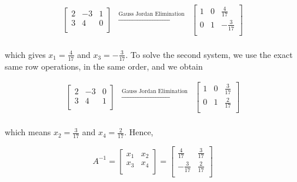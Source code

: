 \documentclass{ximera}
\begin{document}
\[ \begin{array}{ccc}

\left[ \begin{array}{rr|r} 2 & -3 & 1 \\ 3 & 4 & 0 \\ \end{array} \right] 
&
\xrightarrow{\text{Gauss Jordan Elimination}}

&
\left[ \begin{array}{rr|r} 1 & 0 & \frac{4}{17} \\  0 & 1 & -\frac{3}{17} \\ \end{array} \right] \\

\end{array}\]

which gives $x_1 =  \frac{4}{17}$ and $x_3 = -\frac{3}{17}$.  To solve the second system, we use the exact same row operations, in the same order, and we obtain

\[ \begin{array}{ccc}

\left[ \begin{array}{rr|r} 2 & -3 & 0 \\ 3 & 4 & 1 \\ \end{array} \right] 
&
\xrightarrow{\text{Gauss Jordan Elimination}}

&
\left[ \begin{array}{rr|r} 1 & 0 & \frac{3}{17} \\  0 & 1 & \frac{2}{17} \\ \end{array} \right] \\

\end{array}\]

which means $x_2 = \frac{3}{17}$ and $x_4 = \frac{2}{17}$.  Hence, 

\[  A^{-1} = \left[ \begin{array}{rr} x_1 & x_2 \\ x_3 & x_4 \\ \end{array} \right] = \left[ \begin{array}{rr} \frac{4}{17} & \frac{3}{17} \\   -\frac{3}{17} & \frac{2}{17} \\ \end{array} \right]   \]
\end{document}
